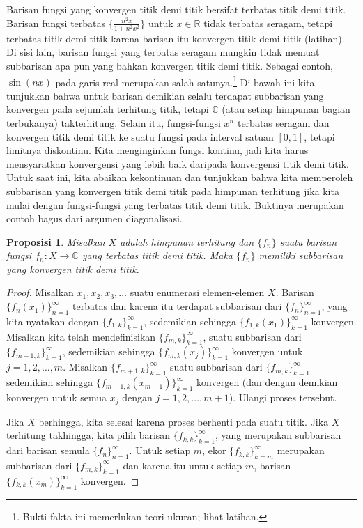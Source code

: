 \documentclass[12pt,openany]{book}
\newcommand{\C}{{\mathbb{C}}}
\newcommand{\R}{{\mathbb{R}}}
\theoremstyle{plain}
\newtheorem{prop}[thm]{Proposisi}
\theoremstyle{remark}
\theoremstyle{definition}
\theoremstyle{exercise}
\theoremstyle{example}
\begin{document}
Barisan fungsi yang konvergen titik demi titik bersifat terbatas titik demi titik.
Barisan fungsi terbatas $\bigl\{ \frac{n^2x}{1+n^2x^2} \bigr\}$
untuk $x \in \R$
tidak terbatas seragam, tetapi terbatas titik demi titik karena barisan itu konvergen
titik demi titik (latihan).
Di sisi lain,
barisan fungsi yang terbatas seragam mungkin
tidak memuat subbarisan apa pun yang bahkan konvergen titik demi titik.
Sebagai contoh, $\sin(nx)$ pada garis real merupakan salah satunya.\footnote{%
Bukti fakta ini memerlukan teori ukuran; lihat latihan.}
Di bawah ini kita tunjukkan bahwa untuk barisan demikian selalu terdapat
subbarisan yang konvergen pada sejumlah terhitung
titik, tetapi $\C$ (atau setiap himpunan bagian terbukanya) takterhitung.
Selain itu,
fungsi-fungsi $x^n$ terbatas seragam
dan konvergen titik demi titik ke suatu fungsi pada interval satuan $[0,1]$, tetapi limitnya
diskontinu.  Kita menginginkan fungsi
kontinu, jadi kita harus mensyaratkan konvergensi yang lebih baik daripada konvergensi titik demi titik.  Untuk saat ini,
kita abaikan kekontinuan dan tunjukkan bahwa kita memperoleh subbarisan
yang konvergen titik demi titik pada himpunan terhitung
jika kita mulai dengan fungsi-fungsi yang terbatas titik demi titik.
Buktinya merupakan contoh bagus dari argumen diagonalisasi.

\begin{prop} \label{prop:subsequenceoncountableX}
Misalkan $X$ adalah himpunan terhitung dan $\{ f_n \}$ suatu barisan fungsi
$f_n \colon X \to \C$ yang terbatas titik demi titik.
Maka $\{ f_n \}$ memiliki subbarisan yang konvergen titik demi titik.
\end{prop}

\begin{proof}
Misalkan $x_1,x_2,x_3,\ldots$ suatu enumerasi elemen-elemen $X$.
Barisan $\{ f_n(x_1) \}_{n=1}^\infty$ terbatas dan karena itu
terdapat subbarisan dari $\{ f_n \}_{n=1}^{\infty}$, yang kita nyatakan dengan
$\{ f_{1,k} \}_{k=1}^\infty$,
sedemikian sehingga
$\{ f_{1,k}(x_1) \}_{k=1}^\infty$ konvergen.
Misalkan kita telah mendefinisikan $\{ f_{m,k} \}_{k=1}^\infty$,
suatu subbarisan dari $\{ f_{m-1,k} \}_{k=1}^\infty$,
sedemikian sehingga
$\{ f_{m,k}(x_j) \}_{k=1}^\infty$ konvergen untuk $j=1,2,\ldots,m$.
Misalkan $\{ f_{m+1,k} \}_{k=1}^\infty$ suatu subbarisan dari
$\{ f_{m,k} \}_{k=1}^\infty$
sedemikian sehingga
$\{ f_{m+1,k}(x_{m+1}) \}_{k=1}^\infty$ konvergen (dan dengan demikian konvergen untuk semua
$x_j$ dengan $j=1,2,\ldots,m+1$).  Ulangi proses tersebut.

Jika $X$ berhingga, kita selesai karena proses berhenti pada suatu titik.
Jika $X$ terhitung takhingga,
kita pilih barisan
$\{ f_{k,k} \}_{k=1}^\infty$,
yang merupakan subbarisan dari barisan semula $\{ f_n \}_{n=1}^\infty$.
Untuk setiap $m$, ekor $\{ f_{k,k} \}_{k=m}^\infty$ merupakan subbarisan dari $\{ f_{m,k}
\}_{k=1}^\infty$
dan karena itu untuk setiap $m$, barisan $\{ f_{k,k}(x_m) \}_{k=1}^\infty$ konvergen.
\end{proof}
\end{document}
